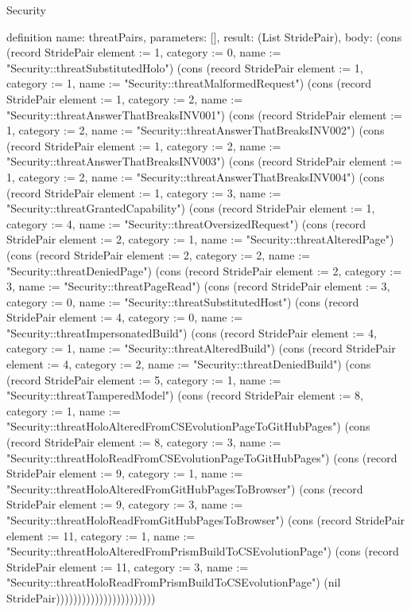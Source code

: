 \begin{lexlean}{Security}
\begin{semanticmodule}
definition{
  name: threatPairs,
  parameters: [],
  result: (List StridePair),
  body: (cons (record StridePair {element := 1, category := 0, name := "Security::threatSubstitutedHolo"}) (cons (record StridePair {element := 1, category := 1, name := "Security::threatMalformedRequest"}) (cons (record StridePair {element := 1, category := 2, name := "Security::threatAnswerThatBreaksINV001"}) (cons (record StridePair {element := 1, category := 2, name := "Security::threatAnswerThatBreaksINV002"}) (cons (record StridePair {element := 1, category := 2, name := "Security::threatAnswerThatBreaksINV003"}) (cons (record StridePair {element := 1, category := 2, name := "Security::threatAnswerThatBreaksINV004"}) (cons (record StridePair {element := 1, category := 3, name := "Security::threatGrantedCapability"}) (cons (record StridePair {element := 1, category := 4, name := "Security::threatOversizedRequest"}) (cons (record StridePair {element := 2, category := 1, name := "Security::threatAlteredPage"}) (cons (record StridePair {element := 2, category := 2, name := "Security::threatDeniedPage"}) (cons (record StridePair {element := 2, category := 3, name := "Security::threatPageRead"}) (cons (record StridePair {element := 3, category := 0, name := "Security::threatSubstitutedHost"}) (cons (record StridePair {element := 4, category := 0, name := "Security::threatImpersonatedBuild"}) (cons (record StridePair {element := 4, category := 1, name := "Security::threatAlteredBuild"}) (cons (record StridePair {element := 4, category := 2, name := "Security::threatDeniedBuild"}) (cons (record StridePair {element := 5, category := 1, name := "Security::threatTamperedModel"}) (cons (record StridePair {element := 8, category := 1, name := "Security::threatHoloAlteredFromCSEvolutionPageToGitHubPages"}) (cons (record StridePair {element := 8, category := 3, name := "Security::threatHoloReadFromCSEvolutionPageToGitHubPages"}) (cons (record StridePair {element := 9, category := 1, name := "Security::threatHoloAlteredFromGitHubPagesToBrowser"}) (cons (record StridePair {element := 9, category := 3, name := "Security::threatHoloReadFromGitHubPagesToBrowser"}) (cons (record StridePair {element := 11, category := 1, name := "Security::threatHoloAlteredFromPrismBuildToCSEvolutionPage"}) (cons (record StridePair {element := 11, category := 3, name := "Security::threatHoloReadFromPrismBuildToCSEvolutionPage"}) (nil StridePair)))))))))))))))))))))))
}


\end{semanticmodule}
\end{lexlean}

